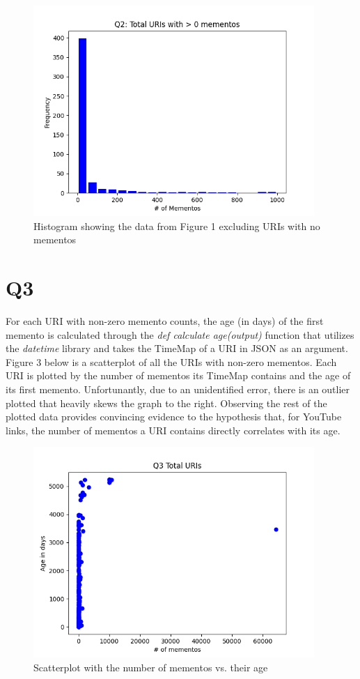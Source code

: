 \documentclass[12pt]{article}
\begin{document}
\begin{figure}[H]
            \centering
            \includegraphics[width=0.95\textwidth]{Final_Histo_Above_Zero.png}
            \caption{Histogram showing the data from Figure 1 excluding URIs with no mementos}
            \label{fig:my_label}
        \end{figure}
        

\section*{Q3}

For each URI with non-zero memento counts, the age (in days) of the first memento is calculated through the \emph{def calculate \textunderscore age(output)} function that utilizes the \emph{datetime} library and takes the TimeMap of a URI in JSON as an argument. Figure 3 below is a scatterplot of all the URIs with non-zero mementos. Each URI is plotted by the number of mementos its TimeMap contains and the age of its first memento. Unfortunantly, due to an unidentified error, there is an outlier plotted that heavily skews the graph to the right. Observing the rest of the plotted data provides convincing evidence to the hypothesis that, for YouTube links, the number of mementos a URI contains directly correlates with its age.

\begin{figure}[H]
            \centering
            \includegraphics[width=0.95\textwidth]{Final_Scatter.png}
            \caption{Scatterplot with the number of mementos vs. their age}
            \label{fig:my_label}
        \end{figure}
\end{document}
